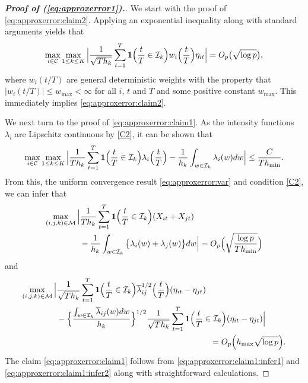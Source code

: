 \documentclass[a4paper,12pt]{article}
\numberwithin{equation}{section}
\begin{document}
\begin{proof}[\textnormal{\textbf{Proof of (\ref{eq:approxerror1}).}}]
We start with the proof of \eqref{eq:approxerror:claim2}. Applying an exponential inequality along with standard arguments yields that 
\begin{equation}\label{eq:approxerror:var}
\max_{i \in \mathcal{C}} \max_{1 \le k \le K} \Big| \frac{1}{\sqrt{Th_k}} \sum\limits_{t=1}^T \boldsymbol{1}\Big(\frac{t}{T} \in \mathcal{I}_k\Big) w_i\Big(\frac{t}{T}\Big) \eta_{it} \Big| = O_p \big( \sqrt{\log p} \big),
\end{equation}
where $w_i(t/T)$ are general deterministic weights with the property that $|w_i(t/T)| \le w_{\max} < \infty$ for all $i$, $t$ and $T$ and some positive constant $w_{\max}$. This immediately implies \eqref{eq:approxerror:claim2}.


We next turn to the proof of \eqref{eq:approxerror:claim1}. As the intensity functions $\lambda_i$ are Lipschitz continuous by \ref{C2}, it can be shown that 
\begin{equation}\label{eq:approxerror:bias}
\max_{i \in \mathcal{C}} \max_{1 \le k \le K} \Big| \frac{1}{Th_k} \sum\limits_{t=1}^T \boldsymbol{1}\Big(\frac{t}{T} \in \mathcal{I}_k\Big) \lambda_i \Big(\frac{t}{T}\Big) - \frac{1}{h_k} \int_{w \in \mathcal{I}_k} \lambda_i(w) dw \Big| \le \frac{C}{T h_{\min}}.
\end{equation}
From this, the uniform convergence result \eqref{eq:approxerror:var} and condition \ref{C2}, we can infer that 
\begin{align}
 \max_{(i,j,k) \in \mathcal{M}} \Big| & \frac{1}{Th_k} \sum\limits_{t=1}^T \boldsymbol{1}\Big(\frac{t}{T} \in \mathcal{I}_k\Big) (X_{it} + X_{jt}) \nonumber \\* & - \frac{1}{h_k} \int_{w \in \mathcal{I}_k} \big\{ \lambda_i(w) + \lambda_j(w) \big\} dw \Big| = O_p \Big( \sqrt{\frac{\log p}{T h_{\min}}} \Big) \label{eq:approxerror:claim1:infer1} 
\end{align}
and
\begin{align}
 \max_{(i,j,k) \in \indexset} \Big| & \frac{1}{\sqrt{Th_k}} \sum\limits_{t=1}^T \ind\Big(\frac{t}{T} \in \mathcal{I}_k\Big) \overline{\lambda}_{ij}^{1/2}\Big(\frac{t}{T}\Big) (\eta_{it} - \eta_{jt}) \nonumber \\* & - \Big\{\frac{\int_{w \in \mathcal{I}_k} \overline{\lambda}_{ij}(w) dw}{h_k}\Big\}^{1/2} \frac{1}{\sqrt{Th_k}} \sum\limits_{t=1}^T \ind\Big(\frac{t}{T} \in \mathcal{I}_k\Big) (\eta_{it} - \eta_{jt}) \Big| \nonumber \\ & \hspace{6.5cm} = O_p \Big( h_{\max} \sqrt{\log p} \Big). \label{eq:approxerror:claim1:infer2}
\end{align}
The claim \eqref{eq:approxerror:claim1} follows from \eqref{eq:approxerror:claim1:infer1} and \eqref{eq:approxerror:claim1:infer2} along with straightforward calculations.
\end{proof}
\end{document}
